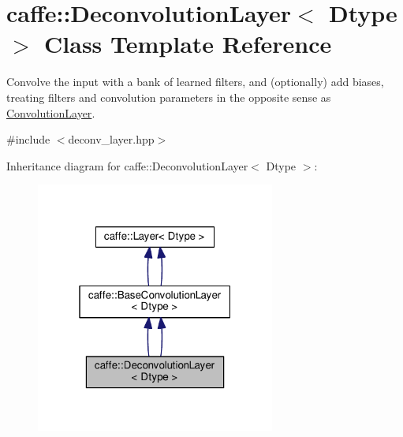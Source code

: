 \hypertarget{classcaffe_1_1_deconvolution_layer}{}\section{caffe\+:\+:Deconvolution\+Layer$<$ Dtype $>$ Class Template Reference}
\label{classcaffe_1_1_deconvolution_layer}


Convolve the input with a bank of learned filters, and (optionally) add biases, treating filters and convolution parameters in the opposite sense as \mbox{\hyperlink{classcaffe_1_1_convolution_layer}{Convolution\+Layer}}.  




{\ttfamily \#include $<$deconv\+\_\+layer.\+hpp$>$}



Inheritance diagram for caffe\+:\+:Deconvolution\+Layer$<$ Dtype $>$\+:
\nopagebreak
\begin{figure}[H]
\begin{center}
\leavevmode
\includegraphics[width=223pt]{classcaffe_1_1_deconvolution_layer__inherit__graph}
\end{center}
\end{figure}
